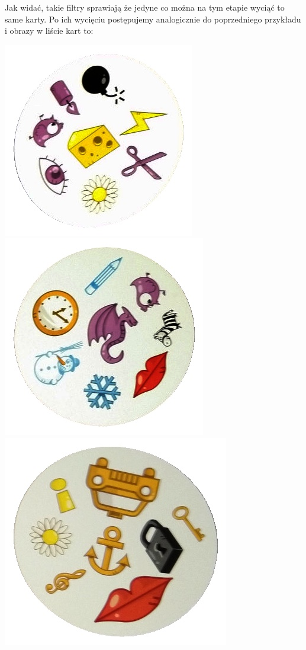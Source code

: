\documentclass[10pt,a4paper]{article}
\begin{document}
\newpage
Jak widać, takie filtry sprawiają że jedyne co można na tym etapie wyciąć to same karty. Po ich wycięciu postępujemy analogicznie do poprzedniego przykładu i obrazy w liście kart to:
\begin{center}
\includegraphics[scale=0.25]{2.2/card2.jpg}
\includegraphics[scale=0.25]{2.2/card0.jpg}
\includegraphics[scale=0.25]{2.2/card1.jpg}
\end{center}
\end{document}
